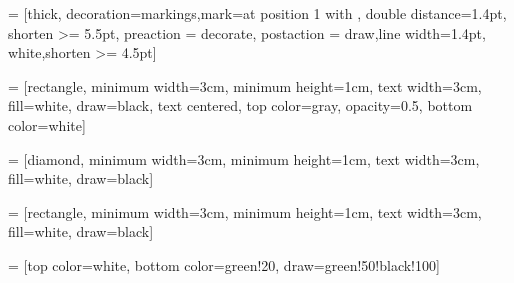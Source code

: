 
\usetikzlibrary{shapes.geometric, arrows, decorations.markings}

 = [thick, decoration={markings,mark=at position
   1 with {}},
   double distance=1.4pt, shorten >= 5.5pt,
   preaction = {decorate},
   postaction = {draw,line width=1.4pt, white,shorten >= 4.5pt}]

 = [rectangle, minimum width=3cm, minimum height=1cm,
                      text width=3cm,
                      fill=white,
                      draw=black,
                      text centered,
                      top color=gray,
                      opacity=0.5,
                      bottom color=white]
                      
 = [diamond, minimum width=3cm, minimum height=1cm,
                      text width=3cm,
                      fill=white,
                      draw=black]

 = [rectangle, minimum width=3cm, minimum height=1cm,
                      text width=3cm,
                      fill=white,
                      draw=black]
                      

 = [top color=white, bottom color=green!20, 
                         draw=green!50!black!100]


